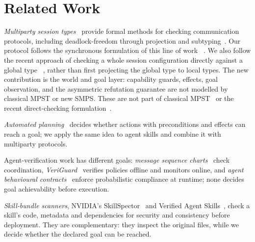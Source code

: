 \documentclass{article}
\theoremstyle{plain}
\theoremstyle{definition}
\def \bmr {}
\def \emr {}
\newcommand{\bnew}{\begingroup\color{revblue}}
\newcommand{\bnew}{\begingroup}
\newcommand{\enew}{\endgroup}
\begin{document}
\section{Related Work}\label{sec:related}

\emph{Multiparty session types}~\cite{honda,liprojection,yoshidagheri} provide
formal methods for checking communication protocols, including
deadlock-freedom through projection and subtyping~\cite{gayhole,ghilezan}.
Our protocol follows the synchronous formulation of this line of work
~\cite{yoshidagheri,ghilezan,scalasyoshida}. We also follow the recent approach
of checking a whole session configuration directly against a global type
~\cite{synthetic2023,synthetic2026}, rather than first projecting the global type to local types. 
The new contribution is the world and goal layer: capability guards, effects, goal observation, and
the asymmetric refutation guarantee are not modelled by classical 
MPST \bmr or new SMPS. \emr
These are not part of classical MPST~\cite{honda,liprojection,yoshidagheri} or the recent
direct-checking formulation~\cite{synthetic2023,synthetic2026}.

\bnew \emph{Automated planning}~\cite{strips} decides whether actions with
preconditions and effects can reach a goal; we apply the same idea to agent
skills and combine it with multiparty protocols.\enew

\bnew Agent-verification work has different goals: \emph{message sequence
charts}~\cite{msc} check coordination, \emph{VeriGuard}~\cite{veriguard}
verifies policies offline and monitors online, and \emph{agent behavioural
contracts}~\cite{abc} enforce probabilistic compliance at runtime; none
decides goal achievability before execution.\enew

\bnew \emph{Skill-bundle scanners}, NVIDIA's SkillSpector~\cite{skillspector}
and Verified Agent Skills~\cite{verifiedskills}, check a skill's code,
metadata and dependencies for security and consistency before deployment.
They are complementary: they inspect the original files, while we decide
whether the declared goal can be reached.\enew
\end{document}
